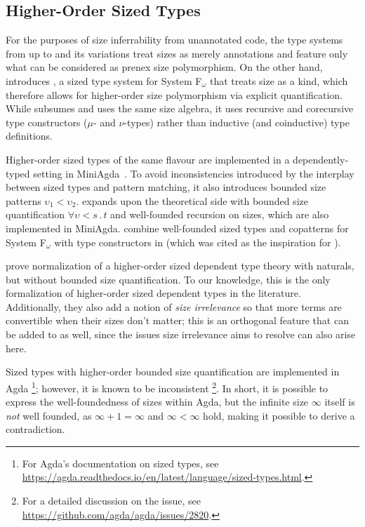 \subsection{Higher-Order Sized Types}

For the purposes of size inferrability from unannotated code,
the type systems from \lambdahat up to \CIChat and its variations treat sizes as merely annotations
and feature only what can be considered as prenex size polymorphism.
On the other hand, \citet{abel-diss} introduces \Fomegahat, a sized type system for System F$_\omega$ that treats size as a kind,
which therefore allows for higher-order size polymorphism via explicit quantification.
While \Fomegahat subsumes \Fhat and uses the same size algebra,
it uses recursive and corecursive type constructors ($\mu$- and $\nu$-types) rather than inductive (and coinductive) type definitions.

Higher-order sized types of the same flavour are implemented in a dependently-typed setting in MiniAgda~\citep{miniagda}.
To avoid inconsistencies introduced by the interplay between sized types and pattern matching,
it also introduces bounded size patterns \mbox{$\upsilon_1 < \upsilon_2$}.
\citet{flationary} expands upon the theoretical side with bounded size quantification \mbox{$\forall \upsilon \mathrel{<} s\mathpunct{.} t$} and well-founded recursion on sizes,
which are also implemented in MiniAgda.
\citet{f-omega-cop} combine well-founded sized types and copatterns for System F$_\omega$ with \corecursive type constructors in \Fomegacop (which was cited as the inspiration for \CIChatsub).

\cite{nbe} prove normalization of a higher-order sized dependent type theory with naturals, but without bounded size quantification.
To our knowledge, this is the only formalization of higher-order sized dependent types in the literature.
Additionally, they also add a notion of \emph{size irrelevance} so that more terms are convertible when their sizes don't matter;
this is an orthogonal feature that can be added to \lang as well,
since the issues size irrelevance aims to resolve can also arise here.

Sized types with higher-order bounded size quantification are implemented in Agda%
\footnote{For Agda's documentation on sized types, see \url{https://agda.readthedocs.io/en/latest/language/sized-types.html}.};
however, it is known to be inconsistent%
\footnote{For a detailed discussion on the issue, see \url{https://github.com/agda/agda/issues/2820}.}.
In short, it is possible to express the well-foundedness of sizes within Agda,
but the infinite size $\infty$ itself is \emph{not} well founded,
as $\infty + 1 = \infty$ and $\infty < \infty$ hold,
making it possible to derive a contradiction.

